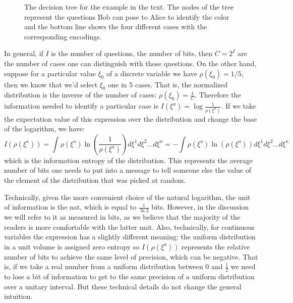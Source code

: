 \documentclass[11pt]{elsarticle}
\begin{document}
\begin{figure}\label{twoQuestions}
	\centering
{}
\caption{The decision tree for the example in the text. The nodes of the tree represent the questions Bob can pose to Alice to identify the color and the bottom line shows the four different cases with the corresponding encodings.}
\end{figure}


In general, if $I$ is the number of questions, the number of bits, then $C = 2 ^ I$ are the number of cases one can distinguish with those questions. On the other hand, suppose for a particular value $\xi_0$ of a discrete variable we have $\rho(\xi_0)=1/5$, then we know that we'd select $\xi_0$ one in 5 cases. That is, the normalized distribution is the inverse of the number of cases: $\rho(\xi_0) = \frac{1}{C}$.  Therefore the information needed to identify a particular case is $I(\xi^a)=\log \frac{1}{\rho(\xi^a)}$. If we take the expectation value of this expression over the distribution and change the base of the logarithm, we have:
\begin{equation}
I(\rho(\xi^a)) = \int \rho(\xi^a) \ln \left(\frac{1}{\rho(\xi^a)}\right) d\xi^1 d\xi^2 ... d\xi^n =-\int \rho(\xi^a) \ln (\rho(\xi^a)) d\xi^1 d\xi^2 ... d\xi^n
\end{equation}
which is the information entropy of the distribution. This represents the average number of bits one needs to put into a message to tell someone else the value of the element of the distribution that was picked at random.

Technically, given the more convenient choice of the natural logarithm, the unit of information is the nat, which is equal to $\frac{1}{\ln 2}$ bits. However, in the discussion we will refer to it as measured in bits, as we believe that the majority of the readers is more comfortable with the latter unit. Also, technically, for continuous variables the expression has a slightly different meaning: the uniform distribution in a unit volume is assigned zero entropy so $I(\rho(\xi^a))$ represents the relative number of bits to achieve the same level of precision, which can be negative. That is, if we take a real number from a uniform distribution between 0 and $\frac{1}{2}$ we need to lose a bit of information to get to the same precision of a uniform distribution over a unitary interval. But these technical details do not change the general intuition.
\end{document}
